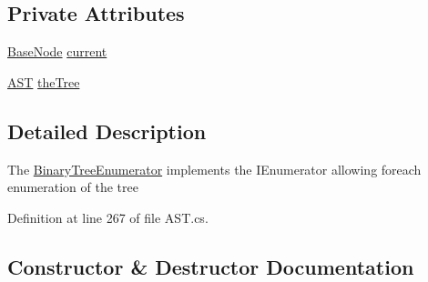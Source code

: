 \subsection*{Private Attributes}
\begin{DoxyCompactItemize}
\item 
\hyperlink{class_c_p_u___o_s___simulator_1_1_compiler_1_1_frontend_1_1_syntax_tree_1_1_base_node}{Base\+Node} \hyperlink{class_c_p_u___o_s___simulator_1_1_compiler_1_1_frontend_1_1_syntax_tree_1_1_a_s_t_1_1_binary_tree_enumerator_a542e4e601c98368748ebed89c0182d6b}{current}
\item 
\hyperlink{class_c_p_u___o_s___simulator_1_1_compiler_1_1_frontend_1_1_syntax_tree_1_1_a_s_t}{A\+S\+T} \hyperlink{class_c_p_u___o_s___simulator_1_1_compiler_1_1_frontend_1_1_syntax_tree_1_1_a_s_t_1_1_binary_tree_enumerator_a9fcce56dd9d833ae0e8a44afb0850c61}{the\+Tree}
\end{DoxyCompactItemize}


\subsection{Detailed Description}
The \hyperlink{class_c_p_u___o_s___simulator_1_1_compiler_1_1_frontend_1_1_syntax_tree_1_1_a_s_t_1_1_binary_tree_enumerator}{Binary\+Tree\+Enumerator} implements the I\+Enumerator allowing foreach enumeration of the tree 



Definition at line 267 of file A\+S\+T.\+cs.



\subsection{Constructor \& Destructor Documentation}
\hypertarget{class_c_p_u___o_s___simulator_1_1_compiler_1_1_frontend_1_1_syntax_tree_1_1_a_s_t_1_1_binary_tree_enumerator_a7daf21f731aae9e9d17d0e72b0161892}{}
